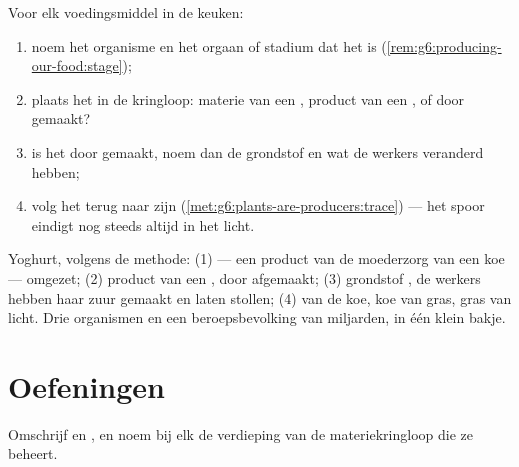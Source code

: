 \begin{method}\label{met:g6:producing-our-food:read}
Voor elk voedingsmiddel in de keuken:
\begin{enumerate}
  \item noem het organisme en het orgaan of stadium dat het is
        (\cref{rem:g6:producing-our-food:stage});
  \item plaats het in de kringloop: materie van een , product
        van een , of door  gemaakt?
  \item is het door  gemaakt, noem dan de grondstof en wat de
        werkers veranderd hebben;
  \item volg het terug naar zijn 
        (\cref{met:g6:plants-are-producers:trace}) --- het spoor eindigt
        nog steeds altijd in het licht.
\end{enumerate}
\end{method}

\begin{example}\label{ex:g6:producing-our-food:breakfast}
Yoghurt, volgens de methode: (1)  --- een product van de moederzorg
van een koe --- omgezet; (2) product van een , door 
afgemaakt; (3) grondstof , de werkers hebben haar zuur gemaakt en
laten stollen; (4)  van de koe, koe van gras, gras van licht. Drie
organismen en een beroepsbevolking van miljarden, in één klein bakje.
\end{example}

\section{Oefeningen}

\begin{exercise}[$\star$]\label{exo:g6:producing-our-food:1}
Omschrijf  en , en noem bij elk de verdieping van de
materiekringloop die ze beheert.
\end{exercise}


